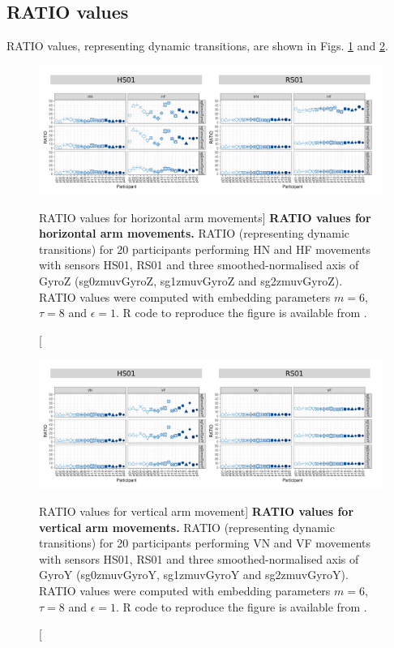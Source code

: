 \newpage
\subsection{RATIO values}
RATIO values, representing dynamic transitions, 
are shown in Figs. \ref{fig:ratio_aH} and \ref{fig:ratio_aV}.


\begin{figure}
\centering
\includegraphics[width=1.0\textwidth]{ratio_aH}
    \caption
	[RATIO values for horizontal arm movements]{
	{\bf RATIO values for horizontal arm movements.}
	RATIO (representing dynamic transitions) for 
	20 participants performing HN and HF movements
	with sensors HS01, RS01 and three smoothed-normalised axis 
	of GyroZ (sg0zmuvGyroZ, sg1zmuvGyroZ and sg2zmuvGyroZ).
	RATIO values were computed with 
	embedding parameters $m=6$, $\tau=8$ and $\epsilon=1$.
	R code to reproduce the figure is available from \cite{xochicale2018}.
        }
    \label{fig:ratio_aH}
\end{figure}
\begin{figure}
\centering
\includegraphics[width=1.0\textwidth]{ratio_aV}
    \caption
	[RATIO values for vertical arm movement]{
	{\bf RATIO values for vertical arm movements.}
	RATIO (representing dynamic transitions) for 
	20 participants performing VN and VF movements
	with sensors HS01, RS01 and three smoothed-normalised axis 
	of GyroY (sg0zmuvGyroY, sg1zmuvGyroY and sg2zmuvGyroY).
	RATIO values were computed with
	embedding parameters $m=6$, $\tau=8$ and $\epsilon=1$.
	R code to reproduce the figure is available from \cite{xochicale2018}.
        }
    \label{fig:ratio_aV}
\end{figure}



